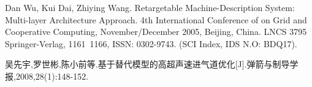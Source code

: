 \begin{resume}
  \begin{enumerate}[label={[\arabic*]},itemsep=0pt,parsep=0pt,labelindent=26pt,labelwidth=*,leftmargin=0pt,itemindent=*,align=left]

  \item Dan Wu, Kui Dai, Zhiying Wang. Retargetable Machine-Description System: Multi-layer Architecture Approach. 4th International Conference of on Grid and Cooperative Computing, November/December 2005, Beijing, China. LNCS 3795 Springer-Verlag, 1161~1166, ISSN: 0302-9743. (SCI Index, IDS N.O: BDQ17).
  \item 吴先宇,罗世彬,陈小前等.基于替代模型的高超声速进气道优化[J].弹箭与制导学报,2008,28(1):148-152.


  \end{enumerate}
\end{resume}
